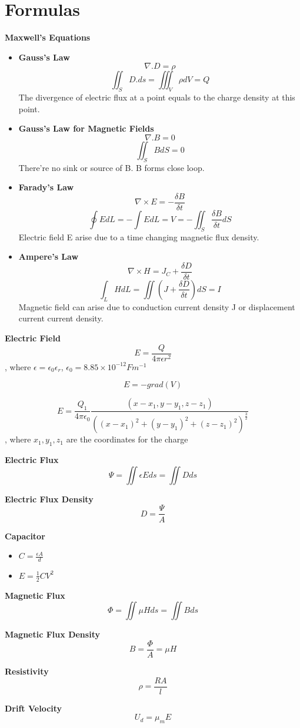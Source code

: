 \documentclass{article}
\begin{document}
\normalsize
  \section{Formulas}
  \textbf{Maxwell's Equations}
\begin{itemize}
\item \textbf{Gauss's Law}  $$ \nabla .D = \rho $$
$$ \iint_SD.ds = \iiint_V\rho dV = Q $$
The divergence of electric flux at a point equals to the charge density at this point.
\item \textbf{Gauss's Law for Magnetic Fields}   $$\nabla .B = 0$$
$$\iint_S B dS = 0$$
There're no sink or source of B. B forms close loop.
\item  \textbf{Farady's Law}  $$\nabla \times E = -\frac{\delta B}{\delta t}$$
$$\oint E dL = -\int EdL = V = -\iint_S \frac{\delta B}{\delta t} dS$$
Electric field E arise due to a time changing magnetic flux density.
\item  \textbf{Ampere's Law}  $$\nabla \times H = J_C + \frac{\delta D}{\delta t}$$
$$\int_L H dL = \iint(J + \frac{\delta D}{\delta t})dS = I $$
Magnetic field can arise due to conduction current density J or displacement current current density.
\end{itemize}
  \textbf{Electric Field}
  $$E = \frac{Q}{4\pi \epsilon r^2}$$, where $\epsilon = \epsilon_0 \epsilon_r$, $\epsilon_0 = 8.85 \times 10^{-12}Fm^{-1}$
  
  $$E = -grad(V)$$

  $$E = \frac{Q_1}{4\pi\epsilon_0}\frac{(x-x_1,y-y_1,z-z_1)}{((x-x_1)^2+(y-y_1)^2+(z-z_1)^2)^\frac{3}{2}}$$, where $x_1,y_1,z_1$ are the coordinates for the charge
  
  \textbf{Electric Flux}
  $$\Psi = \iint\epsilon E ds = \iint Dds $$
  
  
  \textbf{Electric Flux Density}
  $$D = \frac{\Psi}{A}$$

  \textbf{Capacitor}
  \begin{itemize}
  \item $ C = \frac{\epsilon A}{d}$
  \item $E = \frac{1}{2}CV^2$
  \end{itemize}      
  
  \textbf{Magnetic Flux}
  $$ \Phi = \iint \mu Hds = \iint Bds $$
  
  \textbf{Magnetic Flux Density}
  $$B = \frac{\Phi}{A} = \mu H$$
  
  
  \textbf{Resistivity}
  $$\rho = \frac{RA}{l}$$
  
  \textbf{Drift Velocity}
  $$U_d = \mu_m E$$
  
\end{document}
